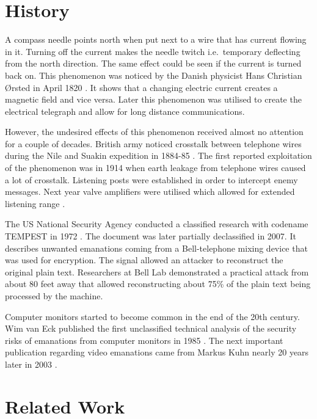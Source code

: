 \documentclass[a4paper,12pt,twoside,openright]{report}
\begin{document}
\section{History}

A compass needle points north when put next to a wire that has current flowing in it. Turning off the current makes the needle twitch i.e.\  temporary deflecting from the north direction. The same effect could be seen if the current is turned back on. This phenomenon was noticed by the Danish physicist Hans Christian \O rsted in April 1820 \cite{jelved1998selected}. It shows that a changing electric current creates a magnetic field and vice versa. Later this phenomenon was utilised to create the electrical telegraph and allow for long distance communications.

However, the undesired effects of this phenomenon received almost no attention for a couple of decades. British army noticed crosstalk between telephone wires during the Nile and Suakin expedition in 1884-85 \cite{nalder1958history}. The first reported exploitation of the phenomenon was in 1914 when earth leakage from telephone wires caused a lot of crosstalk. Listening posts were established in order to intercept enemy messages. Next year valve amplifiers were utilised which allowed for extended listening range \cite{anderson2008security}.

The US National Security Agency conducted a classified research with codename TEMPEST in 1972 \cite{friedman2007tempest}. The document was later partially declassified in 2007. It describes unwanted emanations coming from a Bell-telephone mixing device that was used for encryption. The signal allowed an attacker to reconstruct the original plain text. Researchers at Bell Lab demonstrated a practical attack from about 80 feet away that allowed reconstructing about 75\% of the plain text being processed by the machine.

Computer monitors started to become common in the end of the 20th century. Wim van Eck published the first unclassified technical analysis of the security risks of emanations from computer monitors in 1985 \cite{van1985electromagnetic}. The next important publication regarding video emanations came from Markus Kuhn nearly 20 years later in 2003 \cite{kuhn2003compromising}. 

\section{Related Work}
\label{sec:RelatedWork}
\end{document}
